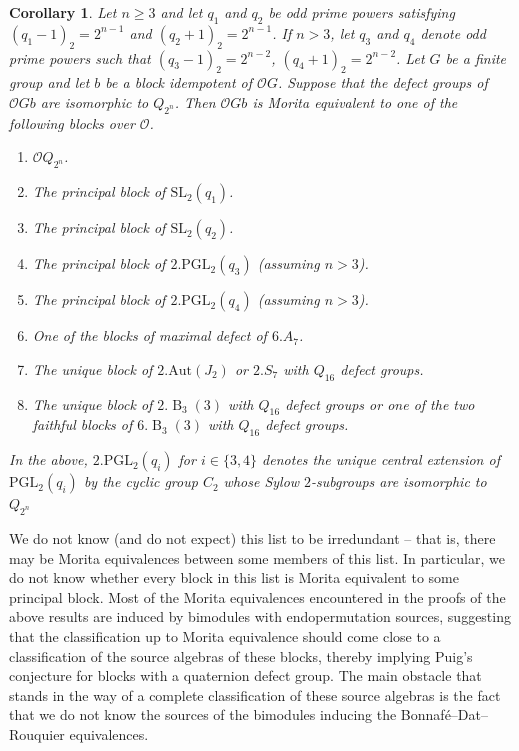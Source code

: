 \documentclass{amsart}
\theoremstyle{plain}\newtheorem{Theorem}{Theorem}[section]
\theoremstyle{plain}\newtheorem{Conjecture}[Theorem]{Conjecture}
\theoremstyle{plain}\newtheorem{Corollary}[Theorem]{Corollary}
\theoremstyle{plain}\newtheorem{Lemma}[Theorem]{Lemma}
\theoremstyle{plain}\newtheorem{Proposition}[Theorem]{Proposition}
\theoremstyle{definition}\newtheorem{Definition}[Theorem]{Definition}
\theoremstyle{definition}\newtheorem{Example}[Theorem]{Example}
\theoremstyle{definition}\newtheorem{Examples}[Theorem]{Examples}
\theoremstyle{definition}\newtheorem{Exercise}[Theorem]{Exercise}
\theoremstyle{definition}\newtheorem{Notation}[Theorem]{Notation}
\theoremstyle{definition}\newtheorem{Remark}[Theorem]{Remark}
\theoremstyle{definition}\newtheorem{Remarks}[Theorem]{Remarks}
\def\CO{{\mathcal{O}}}    \def\OPE{{\mathcal{O}(P\rtimes E)}}
\def\Aut{\mathrm{Aut}}               \def\tenk{\otimes_k}
\def\PGL{\mathrm{PGL}}
\def\SL{\mathrm{SL}}
\newcommand{\type}{\operatorname}
\numberwithin{equation}{section}
\begin{document}
\begin{Corollary}  
Let  $n \geq 3 $ and  let $q_1 $ and $q_2$ be odd prime powers satisfying $(q_1-1)_2 = 2^{n-1}$ 
and $(q_2+1)_2  =2^{n-1}$. If $n>3$, let $q_3$ and $q_4$ denote odd prime powers such that 
$(q_3-1)_2 = 2^{n-2}$, $(q_4+1)_2 =2^{n-2}$. Let  $G$ be a  finite group  and let $b $ be a 
block idempotent of $\CO G$. Suppose that the defect groups of $\CO Gb$  are isomorphic to  
$Q_{2^n}$.  Then   $\CO Gb$  is Morita equivalent  to  one of the following blocks over $\CO$.
\begin{enumerate}
    \item  $\CO Q_{2^n}$.
    \item  The principal  block of $\SL_2(q_1)$.
    \item The principal block   of $\SL_2(q_2)$.
    \item The principal block   of $2.\PGL_2(q_3)$ (assuming $n>3$).
    \item The principal block   of $2.\PGL_2(q_4)$ (assuming $n>3$).
\item One of the blocks of maximal defect of $6.A_7$.
\item  The unique block of $2.\Aut(J_2)$ or $2.S_7$ with $Q_{16}$ defect groups.
\item  The unique block of $2.\type{B}_3(3)$ with $Q_{16}$ defect groups or one of the two faithful blocks of $6.\type{B}_3(3)$ with $Q_{16}$ defect groups. 
\end{enumerate}

In the above, $2.\PGL_2(q_i)$ for $i\in\{3,4\}$ denotes the unique central extension of $\PGL_2(q_i)$ by the cyclic group $C_2$ whose Sylow $2$-subgroups are isomorphic to $Q_{2^n}$
\end{Corollary}

We do not know (and do not expect) this list to be irredundant -- that is, there may
be Morita equivalences between some members of this list. In particular, we do not
know whether every block in this list is Morita equivalent to some principal block.
Most of the Morita equivalences encountered in the proofs of the above results
are induced by bimodules with endopermutation sources, suggesting that the
classification up to Morita equivalence should come close to a classification of
the source algebras of these blocks, thereby implying Puig's conjecture for
blocks with a quaternion defect group. The  main obstacle that stands in
the way of a complete classification of these source algebras is the fact that we do 
not know the sources of the bimodules inducing the Bonnaf\'e--Dat--Rouquier 
equivalences. 
\end{document}
